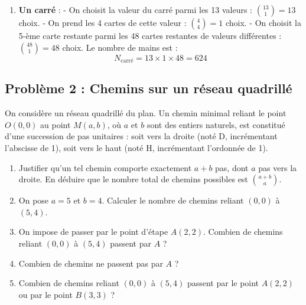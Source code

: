 \begin{enumerate}
\begin{enumerate}
        \item \textbf{Un carré} :
        - On choisit la valeur du carré parmi les 13 valeurs : $\binom{13}{1} = 13$ choix.
        - On prend les 4 cartes de cette valeur : $\binom{4}{4} = 1$ choix.
        - On choisit la 5-ème carte restante parmi les 48 cartes restantes de valeurs différentes : $\binom{48}{1} = 48$ choix.
        Le nombre de mains est :
        \[
        N_{\text{carré}} = 13 \times 1 \times 48 = 624
        \]
    \end{enumerate}
\end{enumerate}

\subsection*{Problème 2 : Chemins sur un réseau quadrillé}
On considère un réseau quadrillé du plan. Un chemin minimal reliant le point $O(0,0)$ au point $M(a,b)$, où $a$ et $b$ sont des entiers naturels, est constitué d'une succession de pas unitaires : soit vers la droite (noté D, incrémentant l'abscisse de 1), soit vers le haut (noté H, incrémentant l'ordonnée de 1).
\begin{enumerate}
    \item Justifier qu'un tel chemin comporte exactement $a+b$ pas, dont $a$ pas vers la droite. En déduire que le nombre total de chemins possibles est $\binom{a+b}{a}$.
    \item On pose $a=5$ et $b=4$. Calculer le nombre de chemins reliant $(0,0)$ à $(5,4)$.
    \item On impose de passer par le point d'étape $A(2,2)$. Combien de chemins reliant $(0,0)$ à $(5,4)$ passent par $A$ ?
    \item Combien de chemins ne passent pas par $A$ ?
    \item Combien de chemins reliant $(0,0)$ à $(5,4)$ passent par le point $A(2,2)$ ou par le point $B(3,3)$ ?
\end{enumerate}

